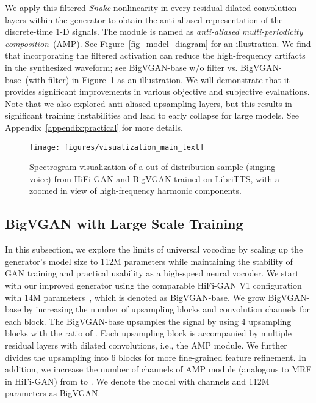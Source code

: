 \documentclass{article} \usepackage{iclr2023_conference,times}
\theoremstyle{plain}
\theoremstyle{definition}
\theoremstyle{remark}
\begin{document}
We apply this filtered \emph{Snake} nonlinearity in every residual dilated convolution layers within the generator to obtain the anti-aliased representation of the discrete-time 1-D signals. The module is named as \emph{anti-aliased multi-periodicity composition}~(AMP). See Figure~\ref{fig_model_diagram} for an illustration. 
We find that incorporating the filtered activation can reduce the high-frequency artifacts in the synthesized waveform; see BigVGAN-base w/o filter vs. BigVGAN-base~(with filter) in Figure~\ref{fig_visualization_main_text} as an illustration.
We will demonstrate that it provides significant improvements in various objective and subjective evaluations.
Note that we also explored anti-aliased upsampling layers, but this results in significant training instabilities and lead to early collapse for large models. See Appendix~\ref{appendix:practical} for more details.


\begin{figure}[t]
\vspace{-.4cm}
\centering
\texttt{[image: figures/visualization\_main\_text]}
\vspace{-.7cm}
\caption{Spectrogram visualization of a out-of-distribution sample (singing voice) from HiFi-GAN and BigVGAN trained on LibriTTS, with a zoomed in view of high-frequency harmonic components.}
\label{fig_visualization_main_text}
\end{figure}


\vspace{-.2cm}
\subsection{BigVGAN with Large Scale Training}
\vspace{-.2cm}
In this subsection, we explore the limits of universal vocoding by scaling up the generator's model size to 112M parameters while maintaining the stability of GAN training and practical usability as a high-speed neural vocoder. We start with our improved generator using the comparable HiFi-GAN V1 configuration with 14M parameters~\citep{kong2020hifi}, which is denoted as BigVGAN-base.
We grow BigVGAN-base by increasing the number of upsampling blocks and convolution channels for each block. The BigVGAN-base upsamples the signal by  using 4 upsampling blocks with the ratio of . Each upsampling block is accompanied by  multiple residual layers with dilated convolutions, i.e., the AMP module. 
We further divides the  upsampling into 6 blocks  for more fine-grained feature refinement. 
In addition, we increase the number of channels of AMP module (analogous to MRF in HiFi-GAN) from  to .
We denote the model with  channels and 112M parameters as BigVGAN.
\end{document}
